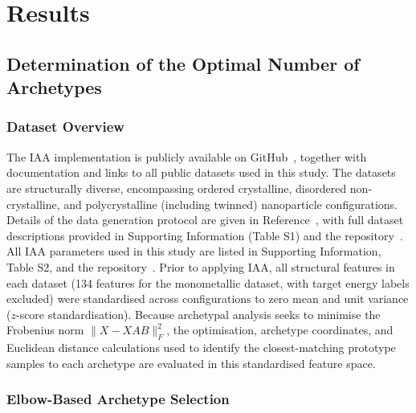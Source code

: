 \documentclass{WileyMSP-template}
\newcommand{\revision}[1]{{\color{red}#1}}
\begin{document}
\section{Results}
\label{sec:results}

\subsection{Determination of the Optimal Number of Archetypes}
\label{sec:optNumArch}

\subsubsection{Dataset Overview}
\label{sec:dataset}

The IAA implementation is publicly available on GitHub~\cite{SuppInfo}, together with documentation and links to all public datasets used in this study. The datasets are structurally diverse, encompassing ordered crystalline, disordered non-crystalline, and polycrystalline (including twinned) nanoparticle configurations. Details of the data generation protocol are given in Reference~\cite{Sun2018PtMD}, with full dataset descriptions provided in Supporting Information (Table S1) and the repository~\cite{SuppInfo}. All IAA parameters used in this study are listed in Supporting Information, Table S2, and the repository~\cite{SuppInfo}. \revision{Prior to applying IAA, all structural features in each dataset (134 features for the monometallic dataset, with target energy labels excluded) were standardised across configurations to zero mean and unit variance ($z$-score standardisation). Because archetypal analysis seeks to minimise the Frobenius norm $\|X - XAB\|_F^2$, the optimisation, archetype coordinates, and Euclidean distance calculations used to identify the closest-matching prototype samples to each archetype are evaluated in this standardised feature space.}

\subsubsection{Elbow-Based Archetype Selection}
\label{sec:elbowSelection}
\end{document}

